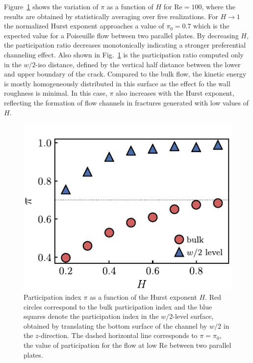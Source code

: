 \documentclass[aps,pre,
superscriptaddress,
twocolumn,
notitlepage,
10pt,
]{revtex4-1}
\begin{document}
Figure~\ref{fig6} shows the variation of  $\pi$ as a function of $H$ for
$\mathrm{Re} = 100$, where the results are obtained by statistically
averaging over five realizations. For $H\rightarrow 1$ the normalized Hurst
exponent approaches a value of $\pi_0=0.7$ which is the expected value for
a Poiseuille flow between two parallel plates. By decreasing $H$, the
participation ratio decreases monotonically indicating a stronger
preferential channeling effect. Also shown in Fig.~\ref{fig6}  is the
participation ratio computed only in the  $ w/2 $-iso distance, defined by
the vertical half distance between the lower and upper boundary of the
crack. Compared to the bulk flow, the kinetic energy is mostly
homogeneously distributed in this surface as the effect fo the wall
roughness is minimal. In this case, $\pi$ also increases with the Hurst
exponent, reflecting the formation of flow channels in fractures generated
with low values of $H$.

\begin{figure}%
	\centering %
	\includegraphics[width=0.99\columnwidth]{fig6.pdf} \caption{Participation
		index
		$\pi$ as a function of the Hurst exponent $H$. Red circles correspond to the
		bulk participation index and the blue squares denote the participation index
		in
		the $w/2$-level surface, obtained by translating the bottom surface of the
		channel by $w/2$ in the $ z $-direction. The dashed horizontal line
		corresponds
		to $\pi=\pi_{0}$, the value of participation for the flow at low
		$\mathrm{Re}$
		between two parallel plates.} \label{fig6} %
\end{figure}
\end{document}
